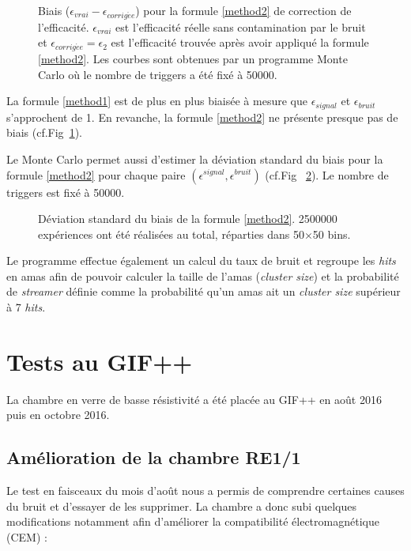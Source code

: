 \begin{figure}[!ht]
	\centering
	\caption{Biais ($\epsilon_{vrai} -\epsilon_{corrig\acute ee}$) pour la formule \ref{method2} de correction de l'efficacité. $\epsilon_{vrai}$ est l'efficacité réelle sans contamination par le bruit et $\epsilon_{corrig\acute ee}=\epsilon_{2}$ est l'efficacité trouvée après avoir appliqué la formule \ref{method2}. Les courbes sont obtenues par un programme Monte Carlo où le nombre de triggers a été fixé à \num{50000}.}
	\label{biaismethod2}
\end{figure}


La formule \ref{method1} est de plus en plus biaisée à mesure que $\epsilon_{signal}$ et $\epsilon_{bruit}$ s'approchent de \num {1}. En revanche, la formule \ref{method2} ne présente presque pas de biais (cf.Fig~\ref{biaismethod2}).

\newpage
Le Monte Carlo permet aussi d'estimer la déviation standard du biais pour la formule \ref{method2} pour chaque paire $\left(\epsilon^{signal},\epsilon^{bruit}\right)$ (cf.Fig~ \ref{RMSmethod2}). Le nombre de triggers est fixé à \num{50000}.

\begin{figure}[!ht]
	\centering
	\caption{Déviation standard du biais de la formule \ref{method2}. \num{2500000} expériences ont été réalisées au total, réparties dans \num{50}$\times$\num{50} bins.}
	\label{RMSmethod2}
\end{figure}
\tikzexternalenable

Le programme effectue également un calcul du taux de bruit et regroupe les \textit{hits} en amas afin de pouvoir calculer la taille de l'amas (\textit{cluster size}) et la probabilité de \textit{streamer} définie comme la probabilité qu'un amas ait un \textit{cluster size} supérieur à \num{7} \textit{hits}.

\section{Tests au GIF++}
\vspace{-0.3cm}
La chambre en verre de basse résistivité a été placée au GIF++ en août 2016 puis en octobre 2016.
\vspace{-0.3cm}
\subsection{Amélioration de la chambre RE1/1}
\label{GIFFF3}
\vspace{-0.3cm}
Le test en faisceaux du mois d'août nous a permis de comprendre certaines causes du bruit et d'essayer de les supprimer.
La chambre a donc subi quelques modifications notamment afin d'améliorer la compatibilité électromagnétique (CEM) \cite{charoy2012comp}:

